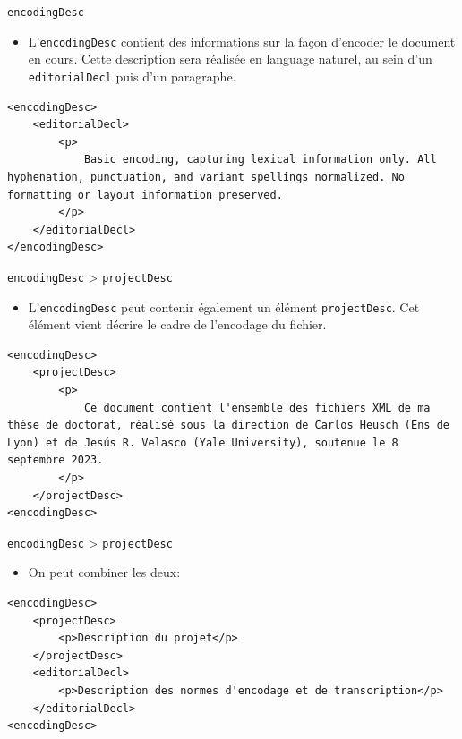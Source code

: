 \documentclass[11pt,aspectratio=1610]{beamer}
\begin{document}
\begin{frame}[containsverbatim]{\texttt{encodingDesc}}
\begin{itemize}
\item L'\texttt{encodingDesc} contient des informations sur la façon d'encoder le document en cours. Cette description sera réalisée en language naturel, au sein d'un \texttt{editorialDecl} puis d'un paragraphe.
\end{itemize}
\begin{verbatim}
<encodingDesc>
    <editorialDecl>
        <p>
            Basic encoding, capturing lexical information only. All hyphenation, punctuation, and variant spellings normalized. No formatting or layout information preserved.
        </p>
    </editorialDecl>
</encodingDesc>
\end{verbatim}
\end{frame}


\begin{frame}[containsverbatim]{\texttt{encodingDesc} > \texttt{projectDesc}}
\begin{itemize}
\item L'\texttt{encodingDesc} peut contenir également un élément \texttt{projectDesc}. Cet élément vient décrire le cadre de l'encodage du fichier.
\end{itemize}
\begin{verbatim}
<encodingDesc>
    <projectDesc>
        <p>
            Ce document contient l'ensemble des fichiers XML de ma thèse de doctorat, réalisé sous la direction de Carlos Heusch (Ens de Lyon) et de Jesús R. Velasco (Yale University), soutenue le 8 septembre 2023.
        </p>
    </projectDesc>
<encodingDesc>
\end{verbatim}
\end{frame}


\begin{frame}[containsverbatim]{\texttt{encodingDesc} > \texttt{projectDesc}}
\begin{itemize}
\item On peut combiner les deux:
\end{itemize}
\begin{verbatim}
<encodingDesc>
    <projectDesc>
        <p>Description du projet</p>
    </projectDesc>
    <editorialDecl>
        <p>Description des normes d'encodage et de transcription</p>
    </editorialDecl>
<encodingDesc>
\end{verbatim}
\end{frame}
\end{document}
